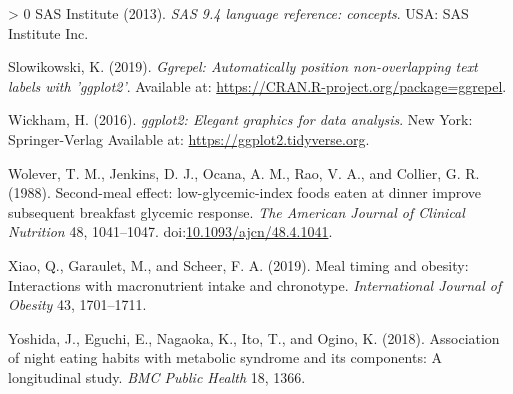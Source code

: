 \documentclass[utf8]{frontiersSCNS}
\newlength{\cslhangindent}
\newenvironment{CSLReferences}[3] %
 {%
  \setlength{\parindent}{0pt}
  \ifodd #1 \everypar{\setlength{\hangindent}{\cslhangindent}}\ignorespaces\fi
  \ifnum #2 > 0
  \setlength{\parskip}{#2\baselineskip}
  \fi
 }%
 {}
\begin{document}
\begin{CSLReferences}{1}{0}
\leavevmode\hypertarget{ref-SAS94}{}%
SAS Institute (2013). \emph{SAS 9.4 language reference: concepts}. USA:
SAS Institute Inc.

\leavevmode\hypertarget{ref-ggrepel}{}%
Slowikowski, K. (2019). \emph{Ggrepel: Automatically position
non-overlapping text labels with 'ggplot2'}. Available at:
\url{https://CRAN.R-project.org/package=ggrepel}.

\leavevmode\hypertarget{ref-ggplot2}{}%
Wickham, H. (2016). \emph{ggplot2: Elegant graphics for data analysis}.
New York: Springer-Verlag Available at:
\url{https://ggplot2.tidyverse.org}.

\leavevmode\hypertarget{ref-Wolever1988}{}%
Wolever, T. M., Jenkins, D. J., Ocana, A. M., Rao, V. A., and Collier,
G. R. (1988). {Second-meal effect: low-glycemic-index foods eaten at
dinner improve subsequent breakfast glycemic response}. \emph{The
American Journal of Clinical Nutrition} 48, 1041--1047.
doi:\href{https://doi.org/10.1093/ajcn/48.4.1041}{10.1093/ajcn/48.4.1041}.

\leavevmode\hypertarget{ref-xiao2019meal}{}%
Xiao, Q., Garaulet, M., and Scheer, F. A. (2019). Meal timing and
obesity: Interactions with macronutrient intake and chronotype.
\emph{International Journal of Obesity} 43, 1701--1711.

\leavevmode\hypertarget{ref-yoshida2018association}{}%
Yoshida, J., Eguchi, E., Nagaoka, K., Ito, T., and Ogino, K. (2018).
Association of night eating habits with metabolic syndrome and its
components: A longitudinal study. \emph{BMC Public Health} 18, 1366.

\end{CSLReferences}
\end{document}
